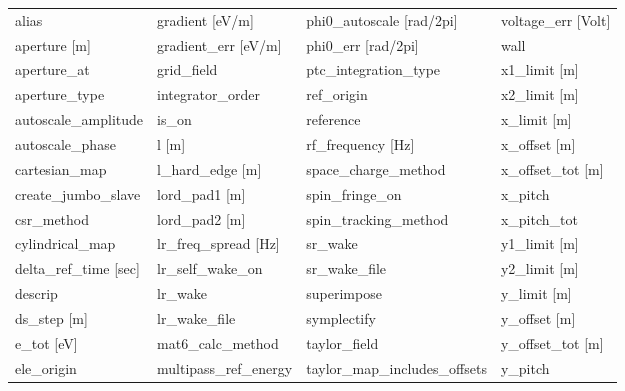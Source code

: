 \begin{tabular}{llll} \toprule
alias                          & gradient [eV/m]                & phi0_autoscale [rad/2pi]       & voltage_err [Volt]             \\
aperture [m]                   & gradient_err [eV/m]            & phi0_err [rad/2pi]             & wall                           \\
aperture_at                    & grid_field                     & ptc_integration_type           & x1_limit [m]                   \\
aperture_type                  & integrator_order               & ref_origin                     & x2_limit [m]                   \\
autoscale_amplitude            & is_on                          & reference                      & x_limit [m]                    \\
autoscale_phase                & l [m]                          & rf_frequency [Hz]              & x_offset [m]                   \\
cartesian_map                  & l_hard_edge [m]                & space_charge_method            & x_offset_tot [m]               \\
create_jumbo_slave             & lord_pad1 [m]                  & spin_fringe_on                 & x_pitch                        \\
csr_method                     & lord_pad2 [m]                  & spin_tracking_method           & x_pitch_tot                    \\
cylindrical_map                & lr_freq_spread [Hz]            & sr_wake                        & y1_limit [m]                   \\
delta_ref_time [sec]           & lr_self_wake_on                & sr_wake_file                   & y2_limit [m]                   \\
descrip                        & lr_wake                        & superimpose                    & y_limit [m]                    \\
ds_step [m]                    & lr_wake_file                   & symplectify                    & y_offset [m]                   \\
e_tot [eV]                     & mat6_calc_method               & taylor_field                   & y_offset_tot [m]               \\
ele_origin                     & multipass_ref_energy           & taylor_map_includes_offsets    & y_pitch                        \\

\end{tabular}
